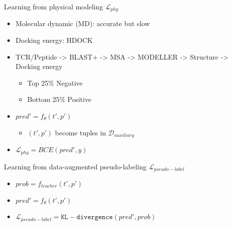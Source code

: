 \documentclass[aspectratio=1610,xcolor={dvipsnames},hyperref={colorlinks,unicode,linkcolor=violet,anchorcolor=blueviolet,citecolor=YellowOrange,filecolor=black,urlcolor=Aquamarine}]{beamer}
\begin{document}
\begin{frame}[label={sec:orgdb0a9c9}]{Learning from physical modeling \(\mathcal{L}_{phy}\)}
\begin{itemize}
\item Molecular dynamic (MD): accurate but slow
\item Docking energy: HDOCK 
\item TCR/Peptide -> BLAST+ -> MSA -> MODELLER -> Structure -> Docking energy
\begin{itemize}
\item Top 25\% Negative
\item Bottom 25\% Positive
\end{itemize}
\item \(pred' = f_{\theta}(t', p')\)
\begin{itemize}
\item \((t', p')\) become tuples in \(\mathcal{D}_{auxiliary}\)
\end{itemize}
\item \(\mathcal{L}_{phy} = BCE(pred', y)\)
\end{itemize}
\end{frame}

\begin{frame}[label={sec:org3b2b31a}]{Learning from data-augmented pseudo-labeling \(\mathcal{L}_{pseudo-label}\)}
\begin{itemize}
\item \(prob = f_{teacher}(t', p')\)
\item \(pred' = f_{\theta}(t', p')\)
\item \(\mathcal{L}_{pseudo-label} = \mathtt{KL-divergence}(pred', prob)\)
\end{itemize}
\end{frame}
\end{document}
